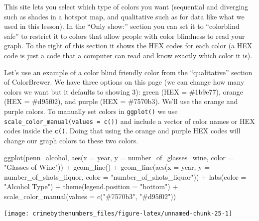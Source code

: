 \documentclass[
]{krantz}
\makeatletter
\newenvironment{Shaded}{\begin{snugshade}}{\end{snugshade}}
\newcommand{\AttributeTok}[1]{\textcolor[rgb]{0.61,0.61,0.61}{#1}}
\newcommand{\FunctionTok}[1]{\textcolor[rgb]{0,0,0}{#1}}
\newcommand{\NormalTok}[1]{#1}
\newcommand{\SpecialCharTok}[1]{\textcolor[rgb]{0,0,0}{#1}}
\newcommand{\StringTok}[1]{\textcolor[rgb]{0.5,0.5,0.5}{#1}}
\newenvironment{kframe}{%
\medskip{}
\setlength{\fboxsep}{.8em}
 \def\at@end@of@kframe{}%
 \ifinner\ifhmode%
  \def\at@end@of@kframe{\end{minipage}}%
  \begin{minipage}{\columnwidth}%
 \fi\fi%
 \def\FrameCommand##1{\hskip\@totalleftmargin \hskip-\fboxsep
 \colorbox{shadecolor}{##1}\hskip-\fboxsep
     \hskip-\linewidth \hskip-\@totalleftmargin \hskip\columnwidth}%
 \MakeFramed {\advance\hsize-\width
   \@totalleftmargin\z@ \linewidth\hsize
   \@setminipage}}%
 {\par\unskip\endMakeFramed%
 \at@end@of@kframe}
\renewenvironment{Shaded}{\begin{kframe}}{\end{kframe}}
\makeatother
\begin{document}
This site lets you select which type of colors you want (sequential and diverging such as shades in a hotspot map, and qualitative such as for data like what we used in this lesson). In the ``Only show:'' section you can set it to ``colorblind safe'' to restrict it to colors that allow people with color blindness to read your graph. To the right of this section it shows the HEX codes for each color (a HEX code is just a code that a computer can read and know exactly which color it is).

Let's use an example of a color blind friendly color from the ``qualitative'' section of ColorBrewer. We have three options on this page (we can change how many colors we want but it defaults to showing 3): green (HEX = \#1b9e77), orange (HEX = \#d95f02), and purple (HEX = \#7570b3). We'll use the orange and purple colors. To manually set colors in \texttt{ggplot()} we use \texttt{scale\_color\_manual(values\ =\ c())} and include a vector of color names or HEX codes inside the \texttt{c()}. Doing that using the orange and purple HEX codes will change our graph colors to these two colors.

\begin{Shaded}
\begin{Highlighting}[]
\FunctionTok{ggplot}\NormalTok{(penn\_alcohol, }\FunctionTok{aes}\NormalTok{(}\AttributeTok{x =}\NormalTok{ year, }\AttributeTok{y =}\NormalTok{ number\_of\_glasses\_wine,}
  \AttributeTok{color =} \StringTok{"Glasses of Wine"}\NormalTok{)) }\SpecialCharTok{+} \FunctionTok{geom\_line}\NormalTok{() }\SpecialCharTok{+} \FunctionTok{geom\_line}\NormalTok{(}\FunctionTok{aes}\NormalTok{(}\AttributeTok{x =}\NormalTok{ year,}
  \AttributeTok{y =}\NormalTok{ number\_of\_shots\_liquor, }\AttributeTok{color =} \StringTok{"number\_of\_shots\_liquor"}\NormalTok{)) }\SpecialCharTok{+}
  \FunctionTok{labs}\NormalTok{(}\AttributeTok{color =} \StringTok{"Alcohol Type"}\NormalTok{) }\SpecialCharTok{+} \FunctionTok{theme}\NormalTok{(}\AttributeTok{legend.position =} \StringTok{"bottom"}\NormalTok{) }\SpecialCharTok{+}
  \FunctionTok{scale\_color\_manual}\NormalTok{(}\AttributeTok{values =} \FunctionTok{c}\NormalTok{(}\StringTok{"\#7570b3"}\NormalTok{, }\StringTok{"\#d95f02"}\NormalTok{))}
\end{Highlighting}
\end{Shaded}

\begin{center}\texttt{[image: crimebythenumbers\_files/figure-latex/unnamed-chunk-25-1]} \end{center}
\end{document}
